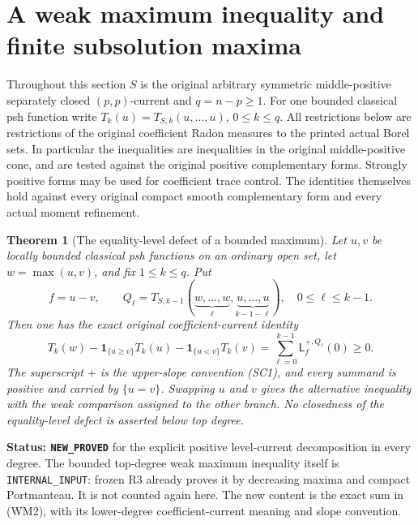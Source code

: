 \documentclass[11pt,a4paper]{article}
\numberwithin{equation}{section}
\newtheorem{theorem}{Theorem}[section]
\theoremstyle{definition}
\theoremstyle{remark}
\begin{document}


\section{A weak maximum inequality and finite subsolution maxima}
\label{sec:r11-weak-maximum-subsolutions}

Throughout this section $S$ is the original arbitrary symmetric
middle-positive separately closed $(p,p)$-current and $q=n-p\geq1$.
For one bounded classical psh function write
$T_k(u)=T_{S,k}(u,\ldots,u)$, $0\leq k\leq q$.
All restrictions below are restrictions of the original coefficient
Radon measures to the printed actual Borel sets. In particular the
inequalities are inequalities in the original middle-positive cone,
and are tested against the original positive complementary forms.
Strongly positive forms may be used for coefficient trace control.
The identities themselves hold against every original compact
smooth complementary form and every actual moment refinement.

\begin{theorem}[The equality-level defect of a bounded maximum]
\label{thm:r11-bounded-weak-maximum}
Let $u,v$ be locally bounded classical psh functions on an ordinary
open set, let $w=\max(u,v)$, and fix $1\leq k\leq q$. Put
\[
 f=u-v,\qquad
 Q_\ell=T_{S,k-1}(
       \underbrace{w,\ldots,w}_{\ell},
       \underbrace{u,\ldots,u}_{k-1-\ell}),
       \quad 0\leq\ell\leq k-1.
 \tag{WM1}
\]
Then one has the exact original coefficient-current identity
\[
 \boxed{\quad
 T_k(w)-\mathbf1_{\{u\geq v\}}T_k(u)
             -\mathbf1_{\{u<v\}}T_k(v)
       =\sum_{\ell=0}^{k-1}
                 \mathsf L_{f}^{+,Q_\ell}(0)\geq0.
 \quad}
 \tag{WM2}
\]
The superscript $+$ is the upper-slope convention (SC1), and every
summand is positive and carried by $\{u=v\}$. Swapping $u$ and
$v$ gives the alternative inequality with the weak comparison
assigned to the other branch. No closedness of the equality-level
defect is asserted below top degree.
\end{theorem}

\noindent\textbf{Status: \texttt{NEW\_PROVED}} for the
explicit positive level-current decomposition in every degree.
The bounded top-degree weak maximum inequality itself is
\texttt{INTERNAL\_INPUT}: frozen R3
 already proves it
by decreasing maxima and compact Portmanteau. It is not counted
again here. The new content is the exact sum in (WM2), with
its lower-degree coefficient-current meaning and slope convention.
\end{document}
